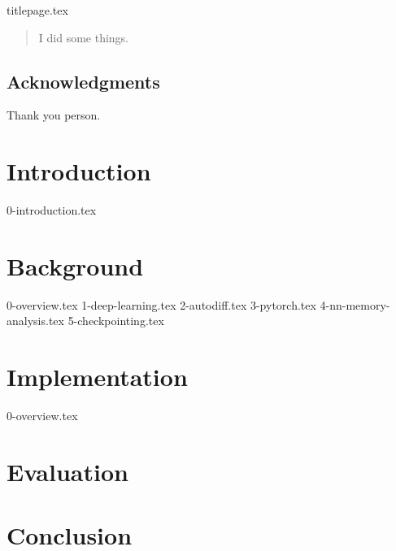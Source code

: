 \documentclass[12pt,twoside]{report}
\begin{document}
{titlepage.tex}

\clearpage{\pagestyle{empty}\cleardoublepage}
\setcounter{page}{1}
\pagestyle{fancy}

\begin{abstract}
I did some things.
\end{abstract}

\cleardoublepage
\section*{Acknowledgments}
Thank you person.

\clearpage{\pagestyle{empty}\cleardoublepage}

\tableofcontents
\clearpage{\pagestyle{empty}}

\listoffigures
\clearpage{\pagestyle{empty}}

\listoflistings

\listofalgorithms

\clearpage{\pagestyle{empty}\cleardoublepage}
\setcounter{page}{1}
\fancyhead[LE,RO]{\slshape \rightmark}
\fancyhead[LO,RE]{\slshape \leftmark}

\chapter{Introduction}
{0-introduction.tex}


\chapter{Background}
{0-overview.tex}
{1-deep-learning.tex}
{2-autodiff.tex}
{3-pytorch.tex}
{4-nn-memory-analysis.tex}
{5-checkpointing.tex}


\chapter{Implementation}
{0-overview.tex}

\chapter{Evaluation}


\chapter{Conclusion}



\end{document}
